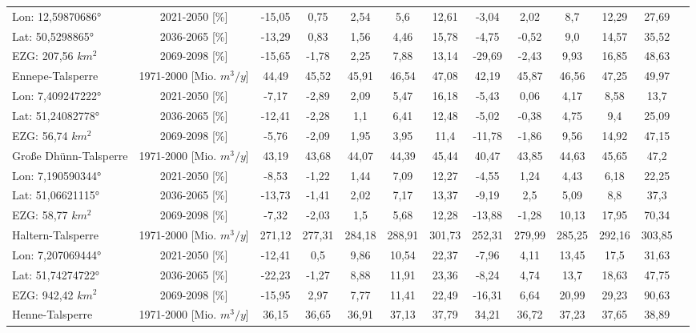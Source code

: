 \begin{longtable}{@{\extracolsep{\fill}}lc|ccccc||cccccc}
\cline{2-13} 
Lon: 12,59870686° & 2021-2050 [\%]  & -15,05 & 0,75 & 2,54 & 5,6 & 12,61 & -3,04 & 2,02 & 8,7 & 12,29 & 27,69 & \\ 
Lat: 50,5298865° & 2036-2065 [\%]  & -13,29 & 0,83 & 1,56 & 4,46 & 15,78 & -4,75 & -0,52 & 9,0 & 14,57 & 35,52 & \\ 
EZG: 207,56 $km^2$ & 2069-2098 [\%]  & -15,65 & -1,78 & 2,25 & 7,88 & 13,14 & -29,69 & -2,43 & 9,93 & 16,85 & 48,63 & \\ 
\hline 
Ennepe-Talsperre & 1971-2000 [Mio. $m^3/y$]  & 44,49 & 45,52 & 45,91 & 46,54 & 47,08 & 42,19 & 45,87 & 46,56 & 47,25 & 49,97 & \\ 
\cline{2-13} 
Lon: 7,409247222° & 2021-2050 [\%]  & -7,17 & -2,89 & 2,09 & 5,47 & 16,18 & -5,43 & 0,06 & 4,17 & 8,58 & 13,7 & \\ 
Lat: 51,24082778° & 2036-2065 [\%]  & -12,41 & -2,28 & 1,1 & 6,41 & 12,48 & -5,02 & -0,38 & 4,75 & 9,4 & 25,09 & \\ 
EZG: 56,74 $km^2$ & 2069-2098 [\%]  & -5,76 & -2,09 & 1,95 & 3,95 & 11,4 & -11,78 & -1,86 & 9,56 & 14,92 & 47,15 & \\ 
\hline 
Große Dhünn-Talsperre & 1971-2000 [Mio. $m^3/y$]  & 43,19 & 43,68 & 44,07 & 44,39 & 45,44 & 40,47 & 43,85 & 44,63 & 45,65 & 47,2 & \\ 
\cline{2-13} 
Lon: 7,190590344° & 2021-2050 [\%]  & -8,53 & -1,22 & 1,44 & 7,09 & 12,27 & -4,55 & 1,24 & 4,43 & 6,18 & 22,25 & \\ 
Lat: 51,06621115° & 2036-2065 [\%]  & -13,73 & -1,41 & 2,02 & 7,17 & 13,37 & -9,19 & 2,5 & 5,09 & 8,8 & 37,3 & \\ 
EZG: 58,77 $km^2$ & 2069-2098 [\%]  & -7,32 & -2,03 & 1,5 & 5,68 & 12,28 & -13,88 & -1,28 & 10,13 & 17,95 & 70,34 & \\ 
\hline 
Haltern-Talsperre & 1971-2000 [Mio. $m^3/y$]  & 271,12 & 277,31 & 284,18 & 288,91 & 301,73 & 252,31 & 279,99 & 285,25 & 292,16 & 303,85 & \\ 
\cline{2-13} 
Lon: 7,207069444° & 2021-2050 [\%]  & -12,41 & 0,5 & 9,86 & 10,54 & 22,37 & -7,96 & 4,11 & 13,45 & 17,5 & 31,63 & \\ 
Lat: 51,74274722° & 2036-2065 [\%]  & -22,23 & -1,27 & 8,88 & 11,91 & 23,36 & -8,24 & 4,74 & 13,7 & 18,63 & 47,75 & \\ 
EZG: 942,42 $km^2$ & 2069-2098 [\%]  & -15,95 & 2,97 & 7,77 & 11,41 & 22,49 & -16,31 & 6,64 & 20,99 & 29,23 & 90,63 & \\ 
\hline 
Henne-Talsperre & 1971-2000 [Mio. $m^3/y$]  & 36,15 & 36,65 & 36,91 & 37,13 & 37,79 & 34,21 & 36,72 & 37,23 & 37,65 & 38,89 & \\ 

\end{longtable}
